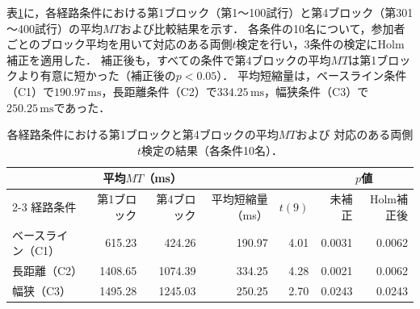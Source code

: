 表\ref{tab:practice-mt-blocks}に，各経路条件における第1ブロック（第1～100試行）と第4ブロック（第301～400試行）の平均\(MT\)および比較結果を示す．
各条件の10名について，参加者ごとのブロック平均を用いて対応のある両側\(t\)検定を行い，3条件の検定にHolm補正を適用した．
補正後も，すべての条件で第4ブロックの平均\(MT\)は第1ブロックより有意に短かった（補正後の\(p<0.05\)）．
平均短縮量は，ベースライン条件（C1）で\(190.97\,\mathrm{ms}\)，長距離条件（C2）で\(334.25\,\mathrm{ms}\)，幅狭条件（C3）で\(250.25\,\mathrm{ms}\)であった．

\begin{table}[htbp]
  \centering
  \caption{各経路条件における第1ブロックと第4ブロックの平均\(MT\)および
  対応のある両側\(t\)検定の結果（各条件10名）．}
  \label{tab:practice-mt-blocks}
  \small
  \begin{tabular}{lrrrrrr}
    \hline
    & \multicolumn{2}{c}{平均\(MT\)（ms）} & & & \multicolumn{2}{c}{\(p\)値} \\
    \cline{2-3}\cline{6-7}
    経路条件 & 第1ブロック & 第4ブロック & 平均短縮量（ms） & \(t(9)\) & 未補正 & Holm補正後 \\
    \hline
    ベースライン（C1） &  615.23 &  424.26 & 190.97 & 4.01 & 0.0031 & 0.0062 \\
    長距離（C2）       & 1408.65 & 1074.39 & 334.25 & 4.28 & 0.0021 & 0.0062 \\
    幅狭（C3）         & 1495.28 & 1245.03 & 250.25 & 2.70 & 0.0243 & 0.0243 \\
    \hline
  \end{tabular}
\end{table}
